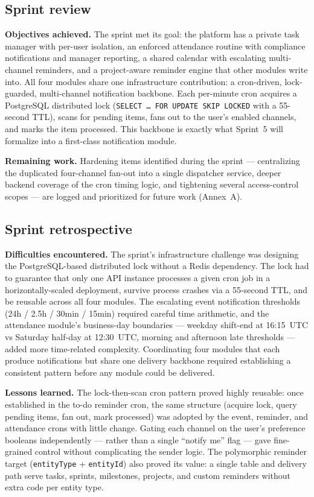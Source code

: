 \subsection{Sprint review}

\textbf{Objectives achieved.} The sprint met its goal: the platform has a private task manager
with per-user isolation, an enforced attendance routine with compliance notifications and
manager reporting, a shared calendar with escalating multi-channel reminders, and a
project-aware reminder engine that other modules write into. All four modules share one
infrastructure contribution: a cron-driven, lock-guarded, multi-channel notification backbone.
Each per-minute cron acquires a PostgreSQL distributed lock (\texttt{SELECT \ldots{} FOR
UPDATE SKIP LOCKED} with a 55-second TTL), scans for pending items, fans out to the user's
enabled channels, and marks the item processed. This backbone is exactly what Sprint~5 will
formalize into a first-class notification module.

\textbf{Remaining work.} Hardening items identified during the sprint --- centralizing the
duplicated four-channel fan-out into a single dispatcher service, deeper backend coverage of the
cron timing logic, and tightening several access-control scopes --- are logged and prioritized for
future work (Annex~A).

\subsection{Sprint retrospective}

\textbf{Difficulties encountered.} The sprint's infrastructure challenge was designing the
PostgreSQL-based distributed lock without a Redis dependency. The lock had to guarantee that
only one API instance processes a given cron job in a horizontally-scaled deployment, survive
process crashes via a 55-second TTL, and be reusable across all four modules. The escalating
event notification thresholds (24h / 2.5h / 30min / 15min) required careful time arithmetic,
and the attendance module's business-day boundaries --- weekday shift-end at 16:15~UTC vs
Saturday half-day at 12:30~UTC, morning and afternoon late thresholds --- added more
time-related complexity. Coordinating four modules that each produce notifications but share one
delivery backbone required establishing a consistent pattern before any module could be
delivered.

\textbf{Lessons learned.} The lock-then-scan cron pattern proved highly reusable: once
established in the to-do reminder cron, the same structure (acquire lock, query pending items,
fan out, mark processed) was adopted by the event, reminder, and attendance crons with little
change. Gating each channel on the user's preference booleans independently --- rather than
a single ``notify me'' flag --- gave fine-grained control without complicating the sender logic.
The polymorphic reminder target (\texttt{entityType} + \texttt{entityId}) also proved its value:
a single table and delivery path serve tasks, sprints, milestones, projects, and custom
reminders without extra code per entity type.

